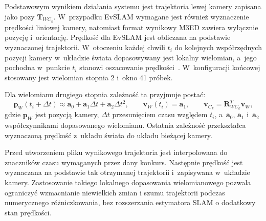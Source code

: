 Podstawowym wynikiem działania systemu jest trajektoria lewej kamery zapisana jako pozy $\mathbf{T}_{W C_k}$. W~przypadku EvSLAM wymagane jest również wyznaczenie prędkości liniowej kamery, natomiast format wynikowy M3ED zawiera wyłącznie pozycję i~orientację.
Prędkość dla EvSLAM jest obliczana na podstawie wyznaczonej trajektorii. W~otoczeniu każdej chwili $t_i$ do kolejnych współrzędnych pozycji kamery w~układzie świata dopasowywany jest lokalny wielomian, a~jego pochodna w~punkcie $t_i$ stanowi oszacowanie prędkości~\cite{savitzky1964smoothing}. W~konfiguracji końcowej stosowany jest wielomian stopnia 2 i~okno 41 próbek.

Dla wielomianu drugiego stopnia zależność ta przyjmuje postać:
\begin{equation}
    \mathbf{p}_W(t_i+\Delta t)
    \approx
    \mathbf{a}_0
    +
    \mathbf{a}_1\Delta t
    +
    \mathbf{a}_2\Delta t^2,
    \qquad
    \mathbf{v}_W(t_i)=\mathbf{a}_1,
    \qquad
    \mathbf{v}_{C_k}
    =
    \mathbf{R}_{W C_k}^{T}\mathbf{v}_W,
    \label{eq:implementation_velocity}
\end{equation}
gdzie $\mathbf{p}_W$ jest pozycją kamery, $\Delta t$ przesunięciem czasu względem $t_i$, a~$\mathbf{a}_0$, $\mathbf{a}_1$ i~$\mathbf{a}_2$ współczynnikami dopasowanego wielomianu. Ostatnia zależność przekształca wyznaczoną prędkość z~układu świata do układu bieżącej kamery.

Przed utworzeniem pliku wynikowego trajektoria jest interpolowana do znaczników czasu wymaganych przez dany konkurs. Następnie prędkość jest wyznaczana na podstawie tak otrzymanej trajektorii i~zapisywana w~układzie kamery.
Zastosowanie takiego lokalnego dopasowania wielomianowego pozwala ograniczyć wzmacnianie niewielkich zmian i szumu trajektorii podczas numerycznego różniczkowania, bez rozszerzania estymatora SLAM o dodatkowy stan prędkości.
